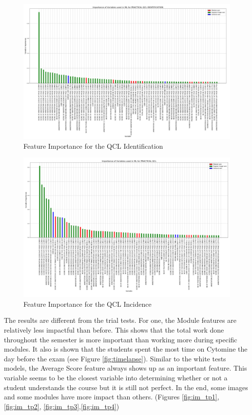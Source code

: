 \documentclass[a4paper,11pt]{report}
\numberwithin{figure}{chapter} %
\begin{document}
      \begin{figure}[H]
      \centering
      \includegraphics[width=.95\linewidth]{plots/var_importance_PRACTICAL_QCL_IDENTIFICATION_2018-04-29_14_34_11.png}
      \caption{Feature Importance for the QCL Identification}
      \label{fig:var_tp3}
      \end{figure}

      \begin{figure}[H]
      \centering
      \includegraphics[width=.95\linewidth]{plots/var_importance_PRACTICAL_QCL_2018-04-29_14_33_44.png}
      \caption{Feature Importance for the QCL Incidence}
      \label{fig:var_tp4}
      \end{figure}

The results are different from the trial tests.
For one, the Module features are relatively less impactful than before.
This shows that the total work done throughout the semester is more important than working more during specific modules.
It also is shown that the students spent the most time on Cytomine the day before the exam (see Figure \ref{fig:timelapse}).
Similar to the white tests models, the Average Score feature always shows up as an important feature.
This variable seems to be the closest variable into determining whether or not a student understands the course but it is still not perfect.
In the end, some images and some modules have more impact than others.  (Figures \ref{fig:im_tp1}, \ref{fig:im_tp2}, \ref{fig:im_tp3},\ref{fig:im_tp4})
\end{document}
